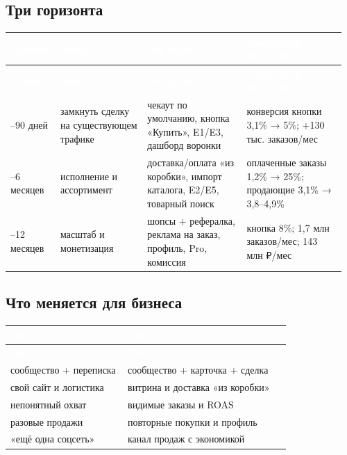 \documentclass[10pt,a4paper]{article}
\begin{document}
\subsection{Три горизонта}

\begingroup
\small
\setlength{\tabcolsep}{3pt}
\renewcommand{\arraystretch}{1.12}
\begin{longtable}{@{}>{\raggedright\arraybackslash}p{0.0808\linewidth}>{\raggedright\arraybackslash}p{0.2626\linewidth}>{\raggedright\arraybackslash}p{0.3098\linewidth}>{\raggedright\arraybackslash}p{0.3098\linewidth}@{}}
\rowcolor{blue}
\textcolor{white}{\textbf{Горизонт}} & \textcolor{white}{\textbf{Фокус}} & \textcolor{white}{\textbf{Что делаем}} & \textcolor{white}{\textbf{Ожидаемый результат}} \\
\endfirsthead
\rowcolor{blue}
\textcolor{white}{\textbf{Горизонт}} & \textcolor{white}{\textbf{Фокус}} & \textcolor{white}{\textbf{Что делаем}} & \textcolor{white}{\textbf{Ожидаемый результат}} \\
\endhead
\hline
0–90 дней & замкнуть сделку на существующем трафике & чекаут по умолчанию, кнопка «Купить», E1/E3, дашборд воронки & конверсия кнопки 3,1\% → 5\%; +130 тыс. заказов/мес \\
3–6 месяцев & исполнение и ассортимент & доставка/оплата «из коробки», импорт каталога, E2/E5, товарный поиск & оплаченные заказы 1,2\% → 25\%; продающие 3,1\% → 3,8–4,9\% \\
6–12 месяцев & масштаб и монетизация & шопсы + рефералка, реклама на заказ, профиль, Pro, комиссия & кнопка 8\%; 1,7 млн заказов/мес; 143 млн ₽/мес \\
\hline
\end{longtable}
\endgroup
\vspace{4pt}

\subsection{Что меняется для бизнеса}

\begingroup
\small
\setlength{\tabcolsep}{3pt}
\renewcommand{\arraystretch}{1.12}
\begin{longtable}{@{}>{\raggedright\arraybackslash}p{0.4100\linewidth}>{\raggedright\arraybackslash}p{0.5777\linewidth}@{}}
\rowcolor{blue}
\textcolor{white}{\textbf{Было}} & \textcolor{white}{\textbf{Стало}} \\
\endfirsthead
\rowcolor{blue}
\textcolor{white}{\textbf{Было}} & \textcolor{white}{\textbf{Стало}} \\
\endhead
\hline
сообщество + переписка & сообщество + карточка + сделка \\
свой сайт и логистика & витрина и доставка «из коробки» \\
непонятный охват & видимые заказы и ROAS \\
разовые продажи & повторные покупки и профиль \\
«ещё одна соцсеть» & канал продаж с экономикой \\
\hline
\end{longtable}
\endgroup
\vspace{4pt}
\end{document}
